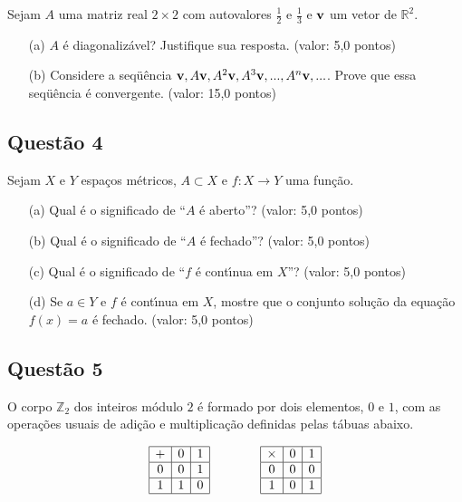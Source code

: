 Sejam $A$ uma matriz real $2 \times 2$ com autovalores $\frac1{2}$ e $\frac1{3}$ e $\textbf v$ um vetor de $\mathbb R^2$.

\begin{enumerate}

\item[(a)] $A$ \'e diagonaliz\'avel? Justifique sua resposta. (valor: 5,0 pontos)

\item[(b)] Considere a seqü\^encia $\textbf v , A\textbf v , A^2\textbf v , A^3\textbf v , ... , A^n\textbf v , ... $. Prove que essa seqü\^encia \'e convergente. (valor: 15,0 pontos)

\end{enumerate}

\subsection{\color{blue} Quest\~ao 4}

Sejam $X$ e $Y$ espa\c cos m\'etricos, $A \subset X$ e $f: X \to Y$ uma fun\c c\~ao.

\begin{enumerate}

\item[(a)] Qual \'e o significado de “$A$ \'e aberto”? (valor: 5,0 pontos)

\item[(b)] Qual \'e o significado de “$A$ \'e fechado”? (valor: 5,0 pontos)

\item[(c)] Qual \'e o significado de “$f$ \'e cont\'\i nua em $X$”? (valor: 5,0 pontos)

\item[(d)] Se $a \in Y$ e $f$ \'e cont\'\i nua em $X$, mostre que o conjunto solu\c c\~ao da equa\c c\~ao $f(x) = a$ \'e fechado. (valor: 5,0 pontos)

\end{enumerate}

\subsection{\color{blue} Quest\~ao 5}

O corpo $\mathbb Z_2$ dos inteiros m\'odulo $2$ \'e formado por dois elementos, $0$ e $1$, com as opera\c c\~oes usuais de adi\c c\~ao e multiplica\c c\~ao definidas pelas t\'abuas abaixo.

$$\begin{array}{|c|c|c|}
\hline + & 0 & 1 \\
\hline 0 & 0 & 1 \\
\hline 1 & 1 & 0 \\
\hline
\end{array} \qquad \qquad
\begin{array}{|c|c|c|}
\hline \times & 0 & 1 \\
\hline 0 & 0 & 0 \\
\hline 1 & 0 & 1 \\
\hline
\end{array}$$

